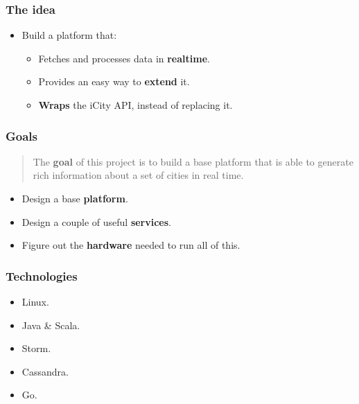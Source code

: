 \documentclass[12pt]{beamer}
\begin{document}
\begin{frame}
\vfill
  \frametitle{The idea}
  \begin{itemize}
    \item Build a platform that:
    \vfill
    \begin{itemize}
      \item Fetches and processes data in {\bf realtime}.
      \vfill
      \item Provides an easy way to {\bf extend} it.
      \vfill
      \item {\bf Wraps} the iCity API, instead of replacing it.
    \end{itemize}
  \end{itemize}
\vfill
\end{frame}

\begin{frame}
\vfill
  \frametitle{Goals}
  \begin{quotation}
    The {\bf goal} of this project is to build a base platform that is able to
generate rich information about a set of cities in real time.
  \end{quotation}

  \begin{itemize}
    \item Design a base {\bf platform}.
    \vfill
    \item Design a couple of useful {\bf services}.
    \vfill
    \item Figure out the {\bf hardware} needed to run all of this.
  \end{itemize}
\vfill
\end{frame}

\begin{frame}
\vfill
  \frametitle{Technologies}
  \begin{itemize}
    \item Linux.
    \vfill
    \item Java \& Scala.
    \vfill
    \item Storm.
    \vfill
    \item Cassandra.
    \vfill
    \item Go.
    \vfill
  \end{itemize}
\vfill
\end{frame}
\end{document}
